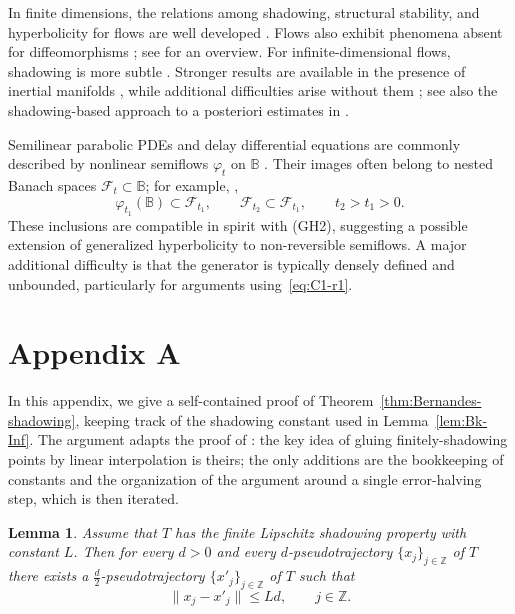 \documentclass[12pt]{article}
\newcommand{\Bb}{\mathbb{B}}
\newcommand{\Zz}{\mathbb{Z}}
\newtheorem{lem}[thm]{Lemma}
\theoremstyle{definition}
\begin{document}
In finite dimensions, the relations among shadowing, structural stability, and hyperbolicity for flows are well developed
\cite{Pil97,Robinson1974,Hayashi1997,GanWen2006,Tikh2008,PalmPilTikh2012,GanLiTikh2016,Li2020,WenBook2016}.
Flows also exhibit phenomena absent for diffeomorphisms
\cite{GuckenheimerWilliams1979,MoralesPacificoPujals2004,PilTikh2008,PilTikh2010,Tikh2015,Murakami2023};
see \cite{FisherHasselblatt} for an overview.
For infinite-dimensional flows, shadowing is more subtle
\cite{Henry94,CLP1989}.
Stronger results are available in the presence of inertial manifolds
\cite{SellYou,FST1988,Ragazzo1994,Robinson2001,Llave2009},
while additional difficulties arise without them
\cite{ACH1992,CLR2012,ACK2025};
see also the shadowing-based approach to a posteriori estimates in
\cite{ApushRepinTikh}.

Semilinear parabolic PDEs and delay differential equations are commonly described by nonlinear semiflows $\varphi_t$ on $\Bb$
\cite{Pazy1983,Lunardi1995,Henry1981,Diekmann-vGils-VerduynLunel-Walther1995,Hale-VerduynLunel1993}.
Their images often belong to nested Banach spaces $\mathcal F_t\subset\Bb$; for example,
\cite{HochsRoberts2019},
\[
\varphi_{t_1}(\Bb)\subset\mathcal F_{t_1},
\qquad
\mathcal F_{t_2}\subset\mathcal F_{t_1},
\qquad t_2>t_1>0.
\]
These inclusions are compatible in spirit with {\rm(GH2)}, suggesting a possible extension of generalized hyperbolicity to non-reversible semiflows. A major additional difficulty is that the generator is typically densely defined and unbounded, particularly for arguments using~\eqref{eq:C1-r1}.

\section*{Appendix A}\label{app:BP-constant}

In this appendix, we give a self-contained proof of Theorem~\ref{thm:Bernandes-shadowing}, keeping track of the shadowing constant used in Lemma~\ref{lem:Bk-Inf}. The argument adapts the proof of \cite[Theorem 1]{NilsonPeris}: the key idea of gluing finitely-shadowing points by linear interpolation is theirs; the only additions are the bookkeeping of constants and the organization of the argument around a single error-halving step, which is then iterated. 

\begin{lem}\label{lem:halving}
Assume that $T$ has the finite Lipschitz shadowing property with constant $L$. Then for every $d>0$ and every $d$-pseudotrajectory $\{x_j\}_{j \in \Zz}$ of $T$ there exists a $\tfrac{d}{2}$-pseudotrajectory $\{x'_j\}_{j \in \Zz}$ of $T$ such that
$$
\|x_j - x'_j\| \le Ld, \qquad j \in \Zz.
$$
\end{lem}
\end{document}
